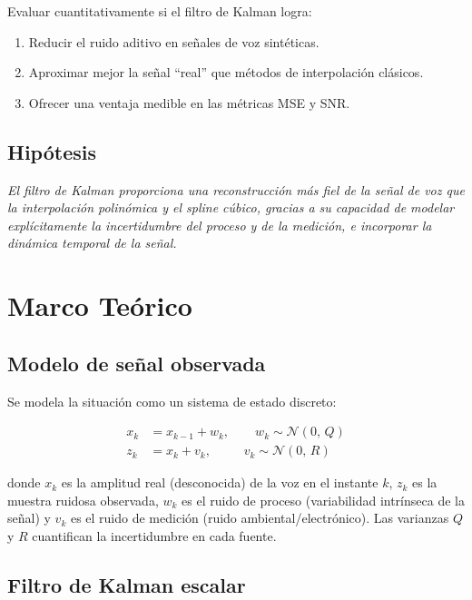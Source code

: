 \documentclass[12pt,a4paper]{article}
\begin{document}
Evaluar cuantitativamente si el filtro de Kalman logra:
\begin{enumerate}
  \item Reducir el ruido aditivo en señales de voz sintéticas.
  \item Aproximar mejor la señal ``real'' que métodos de interpolación clásicos.
  \item Ofrecer una ventaja medible en las métricas MSE y SNR.
\end{enumerate}

\subsection{Hipótesis}

\textit{El filtro de Kalman proporciona una reconstrucción más fiel de la señal de
voz que la interpolación polinómica y el spline cúbico, gracias a su capacidad de
modelar explícitamente la incertidumbre del proceso y de la medición, e incorporar
la dinámica temporal de la señal.}

\section{Marco Teórico}

\subsection{Modelo de señal observada}

Se modela la situación como un sistema de estado discreto:

\begin{align}
  x_k &= x_{k-1} + w_k, \qquad w_k \sim \mathcal{N}(0,\,Q) \label{eq:estado}\\
  z_k &= x_k + v_k, \qquad\;\; v_k \sim \mathcal{N}(0,\,R) \label{eq:medicion}
\end{align}

donde $x_k$ es la amplitud real (desconocida) de la voz en el instante $k$,
$z_k$ es la muestra ruidosa observada, $w_k$ es el ruido de proceso (variabilidad
intrínseca de la señal) y $v_k$ es el ruido de medición (ruido ambiental/electrónico).
Las varianzas $Q$ y $R$ cuantifican la incertidumbre en cada fuente.

\subsection{Filtro de Kalman escalar}
\end{document}
